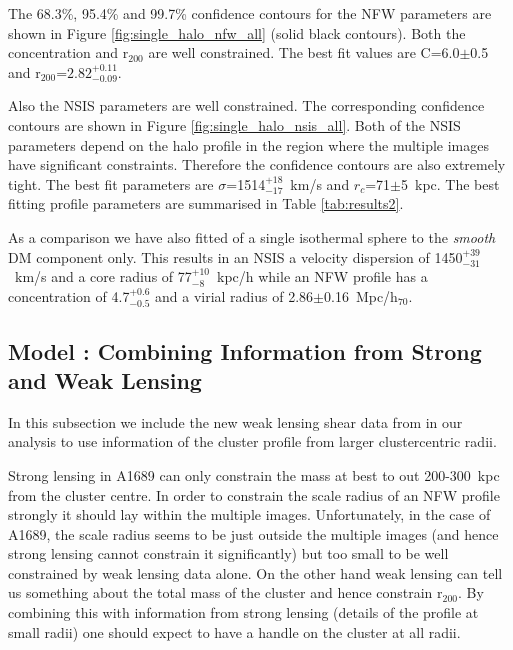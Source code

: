 \documentclass[useAMS,usenatbib]{mn2e}
\newcounter{one}   \setcounter{one}{1}
\newcounter{four}  \setcounter{four}{4}
\begin{document}
The 68.3\%, 95.4\% and 99.7\% confidence contours for the NFW
parameters are shown in Figure \ref{fig:single_halo_nfw_all} (solid
black contours). Both the concentration and r$_{200}$ are well
constrained. The best fit values are C=6.0$\pm$0.5 and
r$_{200}$=$2.82^{+0.11}_{-0.09}$.

Also the NSIS parameters are well constrained. The corresponding
confidence contours are shown in Figure
\ref{fig:single_halo_nsis_all}. Both of the NSIS parameters depend on
the halo profile in the region where the multiple images have
significant constraints. Therefore the confidence contours are also
extremely tight. The best fit parameters are
$\sigma$=1514$_{-17}^{+18}$~km/s and $r_c$=71$\pm$5~kpc. The best
fitting profile parameters are summarised in Table \ref{tab:results2}.

As a comparison we have also fitted of a single isothermal sphere to
the {\it smooth} DM component only. This results in an NSIS a velocity
dispersion of 1450$^{+39}_{-31}$~km/s and a core radius of
77$^{+10}_{-8}$~kpc/h while an NFW profile has a concentration of
4.7$^{+0.6}_{-0.5}$ and a virial radius of
2.86$\pm$0.16~Mpc/h$_{70}$.



\subsection{Model : Combining Information from Strong and Weak Lensing}
\label{sec:sl_wl_combined}

In this subsection we include the new weak lensing shear data from
\citet{broadhurst:05b} in our analysis to use information of the
cluster profile from larger clustercentric radii.

Strong lensing in A1689 can only constrain the mass at best to out
200-300~kpc from the cluster centre. In order to constrain the scale
radius of an NFW profile strongly it should lay within the multiple
images. Unfortunately, in the case of A1689, the scale radius seems to
be just outside the multiple images (and hence strong lensing cannot
constrain it significantly) but too small to be well constrained by
weak lensing data alone. On the other hand weak lensing can tell us
something about the total mass of the cluster and hence constrain
r$_{200}$. By combining this with information from strong lensing
(details of the profile at small radii) one should expect to have a
handle on the cluster at all radii.
\end{document}
